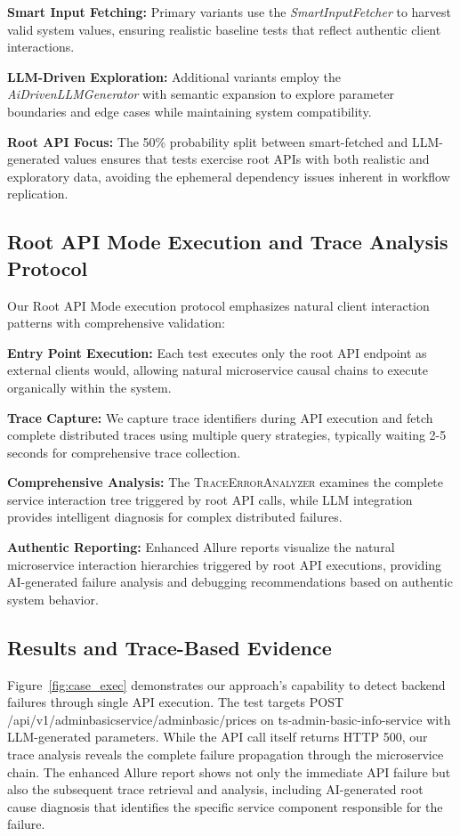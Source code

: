 \documentclass[conference]{IEEEtran}
\begin{document}
\textbf{Smart Input Fetching:} Primary variants use the \emph{SmartInputFetcher} to harvest valid system values, ensuring realistic baseline tests that reflect authentic client interactions.

\textbf{LLM-Driven Exploration:} Additional variants employ the \emph{AiDrivenLLMGenerator} with semantic expansion to explore parameter boundaries and edge cases while maintaining system compatibility.

\textbf{Root API Focus:} The 50\% probability split between smart-fetched and LLM-generated values ensures that tests exercise root APIs with both realistic and exploratory data, avoiding the ephemeral dependency issues inherent in workflow replication.

\subsection{Root API Mode Execution and Trace Analysis Protocol}
Our Root API Mode execution protocol emphasizes natural client interaction patterns with comprehensive validation:

\textbf{Entry Point Execution:} Each test executes only the root API endpoint as external clients would, allowing natural microservice causal chains to execute organically within the system.

\textbf{Trace Capture:} We capture trace identifiers during API execution and fetch complete distributed traces using multiple query strategies, typically waiting 2-5 seconds for comprehensive trace collection.

\textbf{Comprehensive Analysis:} The \textsc{TraceErrorAnalyzer} examines the complete service interaction tree triggered by root API calls, while LLM integration provides intelligent diagnosis for complex distributed failures.

\textbf{Authentic Reporting:} Enhanced Allure reports visualize the natural microservice interaction hierarchies triggered by root API executions, providing AI-generated failure analysis and debugging recommendations based on authentic system behavior.

\subsection{Results and Trace-Based Evidence}
Figure~\ref{fig:case_exec} demonstrates our approach's capability to detect backend failures through single API execution. The test targets POST /api\slash v1\slash adminbasicservice\slash adminbasic\slash prices on ts-admin-basic-info-service with LLM-generated parameters. While the API call itself returns HTTP 500, our trace analysis reveals the complete failure propagation through the microservice chain. The enhanced Allure report shows not only the immediate API failure but also the subsequent trace retrieval and analysis, including AI-generated root cause diagnosis that identifies the specific service component responsible for the failure.
\end{document}
